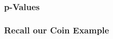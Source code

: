 \documentclass[handout]{beamer}
\newcommand{\blue}[1]{\textcolor{blue2}{#1}}
\begin{document}
\begin{frame}
\frametitle{p-Values}
%
%

\end{frame}


%
%
%
%


\begin{frame}
\frametitle{Recall our Coin Example}
%
\end{frame}
\end{document}
